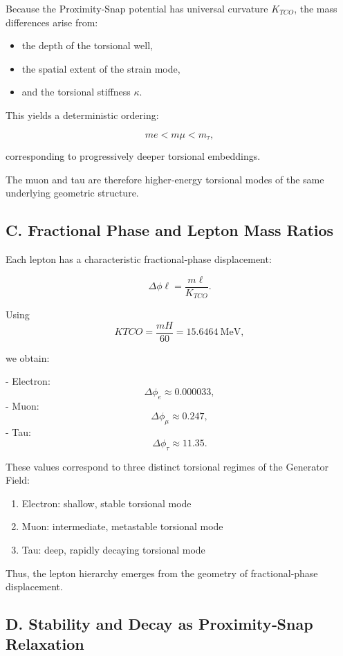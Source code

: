 \documentclass[reprint,amsmath,amssymb,aps,prl,floatfix]{revtex4-2}
\begin{document}
Because the Proximity‑Snap potential has universal curvature \(K_{TCO}\), the mass differences arise from:
\begin{itemize}
\item the depth of the torsional well,  
\item the spatial extent of the strain mode,  
\item and the torsional stiffness \(\kappa\).
\end{itemize}

This yields a deterministic ordering:

\[
me < m\mu < m_\tau,
\]

corresponding to progressively deeper torsional embeddings.
\medskip

The muon and tau are therefore higher‑energy torsional modes of the same underlying geometric structure.

\subsection{C. Fractional Phase and Lepton Mass Ratios}

Each lepton has a characteristic fractional‑phase displacement:

\[
\Delta\phi\ell = \frac{m\ell}{K_{TCO}}.
\]

Using  
\[
K{TCO} = \frac{mH}{60} = 15.6464\ \mathrm{MeV},
\]

we obtain:

- Electron:  
  \[
  \Delta\phi_e \approx 0.000033,
  \]
- Muon:  
  \[
  \Delta\phi_\mu \approx 0.247,
  \]
- Tau:  
  \[
  \Delta\phi_\tau \approx 11.35.
  \]

These values correspond to three distinct torsional regimes of the Generator Field:
\begin{enumerate}
\item Electron: shallow, stable torsional mode  
\item Muon: intermediate, metastable torsional mode  
\item Tau: deep, rapidly decaying torsional mode
\end{enumerate}

Thus, the lepton hierarchy emerges from the geometry of fractional‑phase displacement.

\subsection{D. Stability and Decay as Proximity‑Snap Relaxation}
\end{document}
